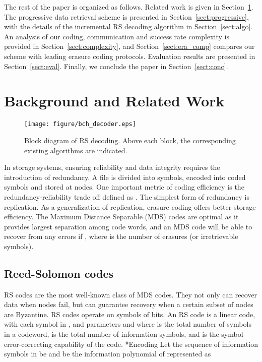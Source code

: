 \documentclass[10pt,journal,letterpaper,compsoc]{IEEEtran}
\makeatletter
\newcommand{\0}{{\bf 0}}
\renewcommand\paragraph{\@startsection{paragraph}{4}{\z@}{1.5ex plus .2ex minus .3ex}{-0em}{\normalsize\bf}}
\makeatother
\begin{document}
The rest of the paper is organized as follows. Related work is given in
Section~\ref{sect:related}. The progressive data retrieval scheme is presented
in Section~\ref{sect:progressive}, with the details of the incremental RS
decoding algorithm in Section~\ref{sect:algo}.  An analysis of our coding,
communication and success rate complexity is provided in
Section~\ref{sect:complexity}, and Section~\ref{sect:era_comp} compares our scheme with leading erasure coding protocols. Evaluation results are presented in
Section~\ref{sect:eval}.  Finally, we
conclude the paper in Section~\ref{sect:conc}.
\section{Background and Related Work}
\label{sect:related}
\begin{figure*}[thp]
\begin{center}
\texttt{[image: figure/bch\_decoder.eps]}
\caption{Block diagram of RS decoding. Above each block, the corresponding existing algorithms are indicated.}
\label{fig:rs_decode}
\end{center}
\end{figure*}
In storage systems, ensuring reliability and data integrity requires the introduction of
redundancy. A file is divided into  symbols, encoded into  coded  symbols and
stored at  nodes. One important metric of coding efficiency is the
redundancy-reliability trade off defined as . The simplest form of redundancy
is replication.  As a generalization of replication, erasure coding offers
better storage efficiency. The Maximum Distance Separable (MDS) codes are
optimal as it provides largest separation among code words, and an MDS
code will be able to recover from any  errors if 
,
where  is the number of erasures (or irretrievable symbols).
\subsection{Reed-Solomon codes}
RS codes are the most well-known class of MDS codes. They not only can recover data when nodes fail, but can guarantee
recovery when a certain subset of nodes are Byzantine. RS codes operate on symbols of
 bits. An  RS code is a linear code, with each symbol in
, and parameters  and  where  is the total
number of symbols in a codeword,  is the total number of information
symbols, and  is the symbol-error-correcting capability of the code.
\paragraph*{Encoding}
Let the sequence of  information symbols in  be
 and  be the information polynomial of 
represented as
\end{document}
